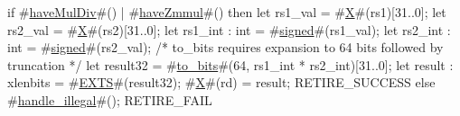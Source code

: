 if #\hyperref[sailRISCVzhaveMulDiv]{haveMulDiv}#() | #\hyperref[sailRISCVzhaveZmmul]{haveZmmul}#() then {
  let rs1_val = #\hyperref[sailRISCVzX]{X}#(rs1)[31..0];
  let rs2_val = #\hyperref[sailRISCVzX]{X}#(rs2)[31..0];
  let rs1_int : int = #\hyperref[sailRISCVzsigned]{signed}#(rs1_val);
  let rs2_int : int = #\hyperref[sailRISCVzsigned]{signed}#(rs2_val);
  /* to_bits requires expansion to 64 bits followed by truncation */
  let result32 = #\hyperref[sailRISCVztozybits]{to\_bits}#(64, rs1_int * rs2_int)[31..0];
  let result : xlenbits = #\hyperref[sailRISCVzEXTS]{EXTS}#(result32);
  #\hyperref[sailRISCVzX]{X}#(rd) = result;
  RETIRE_SUCCESS
} else {
  #\hyperref[sailRISCVzhandlezyillegal]{handle\_illegal}#();
  RETIRE_FAIL
}
